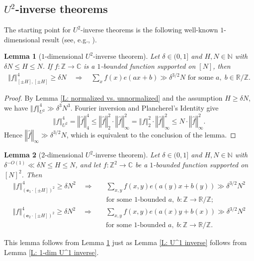 \documentclass[11pt]{amsart}
\newtheorem{lemma}{Lemma}[section]
\theoremstyle{definition}
\newcommand{\N}{{\mathbb N}}
\newcommand{\R}{{\mathbb R}}
\newcommand{\Z}{{\mathbb Z}}
\newcommand{\be}{{\mathbf{e}}}
\newcommand{\norm}[1]{\left\Vert #1\right\Vert}
\begin{document}
\subsection{$U^2$-inverse theorems}
The starting point for $U^2$-inverse theorems is the following well-known $1$-dimensional result (see, e.g., \cite[Lemma 2.4]{Pel20}).
\begin{lemma}[$1$-dimensional $U^2$-inverse theorem]\label{L: 1-dim U^2 inverse}
    Let $\delta\in(0, 1]$ and $H, N\in\N$ with $\delta N \leq H\leq N$.  If $f: \Z \to \mathbb{C}$ is a $1$-bounded function supported on $[N]$, then
    \begin{gather*}
        \norm{f}_{[\pm H], [\pm H]}^4\geq \delta N \quad \Longrightarrow\quad \text{$\sum_{x}f(x)e(a x + b)\gg\delta^{3/2} N$ for some $a,\; b \in \R/\Z$}.
    \end{gather*}
\end{lemma}
\begin{proof}
    By Lemma \ref{L: normalized vs. unnormalized} and the assumption $H\geq \delta N$, we have $\norm{f}_{U^2}^4\gg \delta^3 N^3$.  Fourier inversion and Plancherel's Identity give $$\norm{f}_{U^2}^4=\norm{\hat f}_4^4 \leq \norm{ \hat f}_2^2 \cdot\norm{\hat{f}}_\infty^2=\norm{f}_2^2 \cdot\norm{\hat{f}}_\infty^2\leq N \cdot\norm{\hat{f}}_\infty^2.$$ Hence $\norm{\hat{f}}_\infty\gg \delta^{3/2} N$, which is equivalent to the conclusion of the lemma. 
\end{proof}

\begin{lemma}[$2$-dimensional $U^2$-inverse theorem]\label{L: U^2 inverse}
    Let $\delta\in(0, 1]$ and $H, N\in\N$ with $\delta^{-O(1)}\ll\delta N\leq H\leq N$, and let $f: \Z^2 \to \mathbb{C}$ be a $1$-bounded function supported on $[N]^2$.  Then
\begin{align*}
\norm{f}_{(\be_1\cdot[\pm H])^2}^4\geq \delta N^2 \quad \Longrightarrow\quad &\sum_{x,y}f(x,y)e(a(y) x + b(y))\gg \delta^{3/2} N^2 \\ 
 &\text{for some $1$-bounded $a,\; b: \Z \to \R/\Z$};
\end{align*}
\begin{align*}
\norm{f}^4_{(\be_2\cdot[\pm H])^2}\geq \delta N^2 \quad \Longrightarrow\quad &\sum_{x,y}f(x,y)e(a(x) y + b(x))\gg \delta^{3/2} N^2 \\ 
 &\text{for some $1$-bounded $a,\; b: \Z \to \R/\Z$}.
\end{align*}
\end{lemma}
This lemma follows from Lemma \ref{L: 1-dim U^2 inverse} just as Lemma \ref{L: U^1 inverse} follows from Lemma \ref{L: 1-dim U^1 inverse}.
\end{document}
